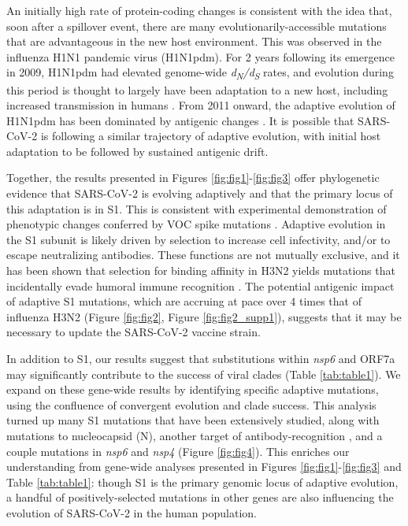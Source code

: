 \documentclass[12pt, letterpaper]{article}
\begin{document}
An initially high rate of protein-coding changes is consistent with the idea that, soon after a spillover event, there are many evolutionarily-accessible mutations that are advantageous in the new host environment. This was observed in the influenza H1N1 pandemic virus (H1N1pdm). For 2 years following its emergence in 2009, H1N1pdm had elevated genome-wide \emph{d\textsubscript{N}/d\textsubscript{S}} rates, and evolution during this period is thought to largely have been adaptation to a new host, including increased transmission in humans \citep{Su2015-az}. From 2011 onward, the adaptive evolution of H1N1pdm has been dominated by antigenic changes \citep{Su2015-az}. It is possible that SARS-CoV-2 is following a similar trajectory of adaptive evolution, with initial host adaptation to be followed by sustained antigenic drift.

Together, the results presented in Figures \ref{fig:fig1}-\ref{fig:fig3} offer phylogenetic evidence that SARS-CoV-2 is evolving adaptively and that the primary locus of this adaptation is in S1. This is consistent with experimental demonstration of phenotypic changes conferred by VOC spike mutations \citep{Wang2021-dm, Greaney2021-jn, Li2020-jd, Liu2021-ne}. Adaptive evolution in the S1 subunit is likely driven by selection to increase cell infectivity, and/or to escape neutralizing antibodies. These functions are not mutually exclusive, and it has been shown that selection for binding affinity in H3N2 yields mutations that incidentally evade humoral immune recognition \citep{Hensley2009-at}. The potential antigenic impact of adaptive S1 mutations, which are accruing at pace over 4 times that of influenza H3N2 (Figure \ref{fig:fig2}, Figure \ref{fig:fig2_supp1}), suggests that it may be necessary to update the SARS-CoV-2 vaccine strain.

In addition to S1, our results suggest that substitutions within \emph{nsp6} and ORF7a may significantly contribute to the success of viral clades (Table \ref{tab:table1}). We expand on these gene-wide results by identifying specific adaptive mutations, using the confluence of convergent evolution and clade success. This analysis turned up many S1 mutations that have been extensively studied, along with mutations to nucleocapsid (N), another target of antibody-recognition \citep{Kang2021-pe}, and a couple mutations in \emph{nsp6} and \emph{nsp4} (Figure \ref{fig:fig4}). This enriches our understanding from gene-wide analyses presented in Figures \ref{fig:fig1}-\ref{fig:fig3} and Table \ref{tab:table1}: though S1 is the primary genomic locus of adaptive evolution, a handful of positively-selected mutations in other genes are also influencing the evolution of SARS-CoV-2 in the human population.
\end{document}
